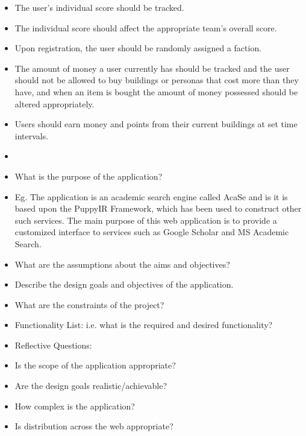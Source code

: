 \documentclass{sig-alt-release2}
\begin{document}
\begin{itemize}

\item The user's individual score should be tracked.

\item The individual score should affect the appropriate team's overall score.

\item Upon registration, the user should be randomly assigned a faction.

\item The amount of money a user currently has should be tracked and the user should not be allowed to buy buildings or personas that cost more than they have, and when an item is bought the amount of money possessed should be altered appropriately.

\item Users should earn money and points from their current buildings at set time intervals.

\item 

\end{itemize}
 
\begin{itemize}

\item	What is the purpose of the application?

\item	Eg. The application is an academic search engine called AcaSe and is it is based upon the PuppyIR Framework\cite{glassey2011framework}, which has been used to construct other such services\cite{glassey2010fifi,elliot2010fifi}. The main purpose of this web application is to provide a customized interface to services such as Google Scholar and MS Academic Search. 

\item	What are the assumptions about the aims and objectives?

\item	Describe the design goals and objectives of the application.

\item	What are the constraints of the project?

\item	Functionality List: i.e. what is the required and desired functionality?

\item	Reflective Questions: 
\item	Is the scope of the application appropriate? 
\item	Are the design goals realistic/achievable? 
\item	How complex is the application? 
\item	Is distribution across the web appropriate? 

\end{itemize}
\end{document}
